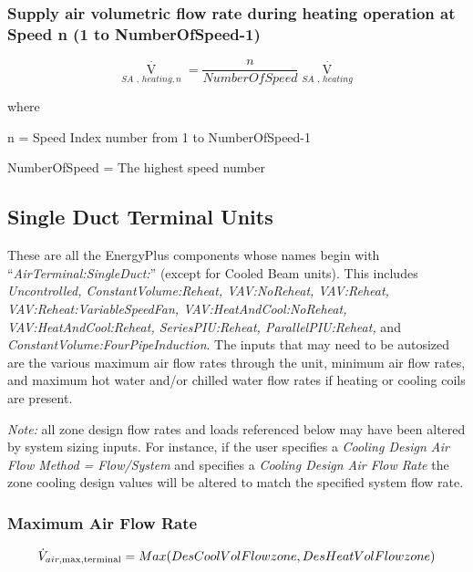 \subsubsection{Supply air volumetric flow rate during heating operation at Speed n (1 to NumberOfSpeed-1)}\label{supply-air-volumetric-flow-rate-during-heating-operation-at-speed-n-1-to-numberofspeed-1}

\begin{equation}
{\mathop V\limits^ \cdot_{SA\,\,,\,heating,n}} = \frac{n}{{NumberOfSpeed}}{\mathop V\limits^ \cdot_{SA\,\,,\,heating}}
\end{equation}

where

n = Speed Index number from 1 to NumberOfSpeed-1

NumberOfSpeed = The highest speed number

\subsection{Single Duct Terminal Units}\label{single-duct-terminal-units}

These are all the EnergyPlus components whose names begin with ``\emph{AirTerminal:SingleDuct:}'' (except for Cooled Beam units). This includes \emph{Uncontrolled, ConstantVolume:Reheat, VAV:NoReheat, VAV:Reheat, VAV:Reheat:VariableSpeedFan, VAV:HeatAndCool:NoReheat, VAV:HeatAndCool:Reheat, SeriesPIU:Reheat, ParallelPIU:Reheat,} and \emph{ConstantVolume:FourPipeInduction}. The inputs that may need to be autosized are the various maximum air flow rates through the unit, minimum air flow rates, and maximum hot water and/or chilled water flow rates if heating or cooling coils are present.

\emph{Note:} all zone design flow rates and loads referenced below may have been altered by system sizing inputs. For instance, if the user specifies a \emph{Cooling Design Air Flow Method = Flow/System} and specifies a \emph{Cooling Design Air Flow Rate} the zone cooling design values will be altered to match the specified system flow rate.

\subsubsection{Maximum Air Flow Rate}\label{maximum-air-flow-rate-3}

\begin{equation}
{\dot V_{air,\max ,{\rm{terminal}}}} = Max(DesCoolVolFlowzone,DesHeatVolFlowzone)
\end{equation}

